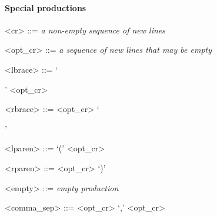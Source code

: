 \paragraph{Special productions}

\begin{grammar}
  <cr> ::= \emph{a non-empty sequence of new lines}

  <opt_cr> ::= \emph{a sequence of new lines that may be empty}

  <lbrace> ::= `{' <opt_cr>

  <rbrace> ::= <opt_cr> `}'

  <lparen> ::= `(' <opt_cr>

  <rparen> ::= <opt_cr> `)'

  <empty> ::= \emph{empty production}

  <comma_sep> ::= <opt_cr> `,' <opt_cr>
\end{grammar}
